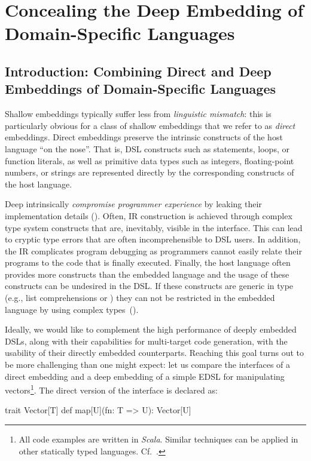 \part{Concealing the Deep Embedding of Domain-Specific Languages}

\chapter{Introduction: Combining Direct and Deep Embeddings of Domain-Specific Languages}


Shallow embeddings typically suffer less from
\emph{linguistic mismatch}: this is particularly obvious for a class of shallow embeddings that we refer to as \emph{direct} embeddings. Direct embeddings preserve the intrinsic constructs of the host language ``on the nose''. That is, DSL
constructs such as  statements, loops, or function literals, as well
as primitive data types such as integers, floating-point numbers, or strings
are represented directly by the corresponding constructs of the host language.
%



Deep \edsls{} intrinsically \emph{compromise programmer experience} by leaking their
implementation details (). Often, IR construction
is achieved through complex type system constructs that are, inevitably,
visible in the \edsl interface. This can lead to cryptic type errors
that are often incomprehensible to DSL users.
In addition, the IR complicates program debugging as programmers cannot easily
relate their programs to the code that is finally executed. Finally, the host
language often provides more constructs than the embedded language and the usage
of these constructs can be undesired in the DSL. If these constructs are generic in type
(e.g., list comprehensions or ) they can not be restricted in the embedded
language by using complex types~().

Ideally, we would like to complement the high performance of deeply
embedded DSLs, along with their capabilities for multi-target code
generation, with the usability of their directly embedded counterparts.
Reaching this goal turns out to be more challenging than one might expect:
let us compare the interfaces of a direct embedding and a deep embedding of a simple
EDSL for manipulating vectors\footnote{
  All code examples are written in \emph{Scala}. Similar techniques can
  be applied in other statically typed languages.  Cf.~\cite{carette_finally_2009,awesome,svenningsson_combining_2012}.}.
The direct version of the interface is declared as:\begin{lstparagraph}
trait Vector[T] {
  def map[U](fn: T => U): Vector[U]
}
\end{lstparagraph}

